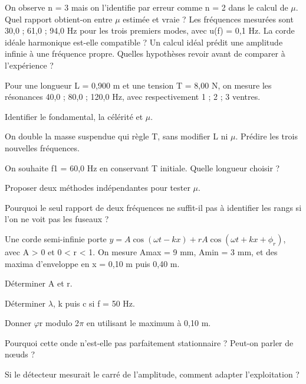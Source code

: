 On observe n = 3 mais on l’identifie par erreur comme n = 2 dans le calcul de \ensuremath{\mu}. Quel rapport obtient-on entre \ensuremath{\mu} estimée et vraie ?
Les fréquences mesurées sont 30,0 ; 61,0 ; 94,0 Hz pour les trois premiers modes, avec u(f) = 0,1 Hz. La corde idéale harmonique est-elle compatible ?
Un calcul idéal prédit une amplitude infinie à une fréquence propre. Quelles hypothèses revoir avant de comparer à l’expérience ?


\label{ch10-ex-D1}
Pour une longueur L = 0,900 m et une tension T = 8,00 N, on mesure les résonances 40,0 ; 80,0 ; 120,0 Hz, avec respectivement 1 ; 2 ; 3 ventres.\begin{questions}
\item Identifier le fondamental, la célérité et \ensuremath{\mu}.
\item On double la masse suspendue qui règle T, sans modifier L ni \ensuremath{\mu}. Prédire les trois nouvelles fréquences.
\item On souhaite f1 = 60,0 Hz en conservant T initiale. Quelle longueur choisir ?
\item Proposer deux méthodes indépendantes pour tester \ensuremath{\mu}.
\item Pourquoi le seul rapport de deux fréquences ne suffit-il pas à identifier les rangs si l’on ne voit pas les fuseaux ?
\end{questions}


\label{ch10-ex-D2}
Une corde semi-infinie porte $y=A\cos(\omega t-kx)+rA\cos(\omega t+kx+\phi_r)$, avec A > 0 et 0 < r < 1. On mesure Amax = 9 mm, Amin = 3 mm, et des maxima d’enveloppe en x = 0,10 m puis 0,40 m.\begin{questions}
\item Déterminer A et r.
\item Déterminer \ensuremath{\lambda}, k puis c si f = 50 Hz.
\item Donner \ensuremath{\varphi}r modulo 2\ensuremath{\pi} en utilisant le maximum à 0,10 m.
\item Pourquoi cette onde n’est-elle pas parfaitement stationnaire ? Peut-on parler de nœuds ?
\item Si le détecteur mesurait le carré de l’amplitude, comment adapter l’exploitation ?
\end{questions}


